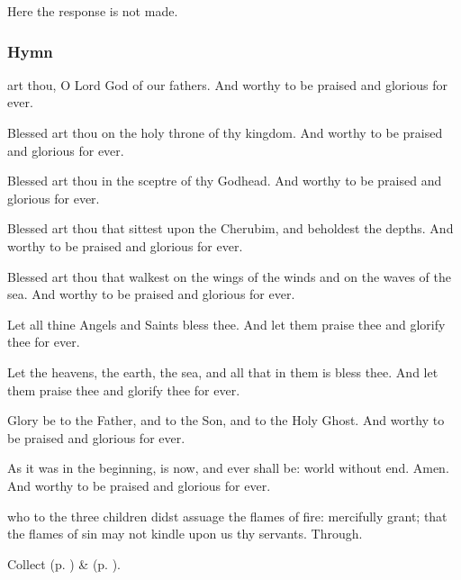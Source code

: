 \begin{rubric}
    Here the response  is not made.
\end{rubric}

\subsubsection{Hymn}
 art thou, O Lord God of our fathers. And worthy to be praised and glorious for ever.\par
{}

Blessed art thou on the holy throne of thy kingdom. And worthy to be praised and glorious for ever.

Blessed art thou in the sceptre of thy Godhead. And worthy to be praised and glorious for ever.

Blessed art thou that sittest upon the Cherubim, and beholdest the depths. And worthy to be praised and glorious for ever.

Blessed art thou that walkest on the wings of the winds and on the waves of the sea. And worthy to be praised and glorious for ever.

Let all thine Angels and Saints bless thee. And let them praise thee and glorify thee for ever.

Let the heavens, the earth, the sea, and all that in them is bless thee. And let them praise thee and glorify thee for ever.

Glory be to the Father, and to the Son, and to the Holy Ghost. And worthy to be praised and glorious for ever.

As it was in the beginning, is now, and ever shall be: world without end. Amen. And worthy to be praised and glorious for ever.\\


{} who to the three children didst assuage the flames of fire: mercifully grant; that the flames of sin may not kindle upon us thy servants. Through.
\begin{rubric}
     Collect  (p. \pageref{AshWednesdayMassCollect}) \&   (p. \pageref{SPLivingDeparted}).
\end{rubric}

